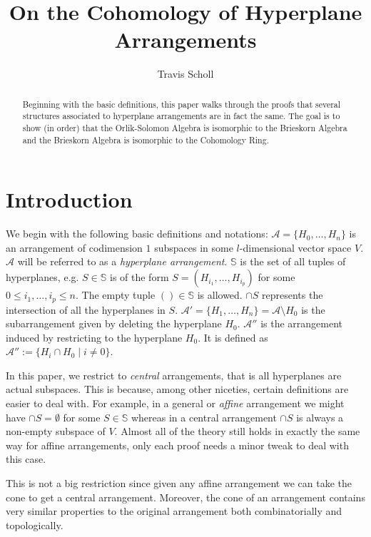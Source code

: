 \documentclass[article,twoside]{article}
\newcommand{\mytitle}{On the Cohomology of Hyperplane Arrangements}
\newcommand{\myauthor}{Travis Scholl}
\newcommand{\BB}[1]{\mathbb{#1}}
\newcommand{\script}[1]{\mathcal{#1}}
\newcommand{\tuples}{\BB{S}}
\theoremstyle{plain}
\theoremstyle{plain}
\theoremstyle{plain}
\theoremstyle{plain}
\theoremstyle{plain}
\theoremstyle{definition}
\theoremstyle{definition}
\theoremstyle{definition}
\theoremstyle{remark}
\theoremstyle{remark}
\begin{document}
\title{\bfseries\sffamily \mytitle}  
\author{\sc \myauthor }
\maketitle

\begin{abstract}
Beginning with the basic definitions, this paper walks through the proofs that several structures associated to hyperplane arrangements are in fact the same. The goal is to show (in order) that the Orlik-Solomon Algebra is isomorphic to the Brieskorn Algebra and the Brieskorn Algebra is isomorphic to the Cohomology Ring.

\end{abstract}

\setcounter{section}{-1}

\section{Introduction}
	\hfil

	We begin with the following basic definitions and notations: $\script{A}=\{H_0,\dots,H_n\}$ is an arrangement of codimension $1$ subspaces in some $l$-dimensional vector space $V$. $\script{A}$ will be referred to as a \emph{hyperplane arrangement}. $\tuples$ is the set of all tuples of hyperplanes, e.g. $S\in \tuples$ is of the form $S=(H_{i_1},\dots,H_{i_p})$ for some $0\leq i_1,\dots,i_p\leq n$. The empty tuple $()\in \tuples$ is allowed. $\cap S$ represents the intersection of all the hyperplanes in $S$. $\script{A}'=\{H_1,\dots,H_n\}=\script{A}\setminus H_0$ is the subarrangement given by deleting the hyperplane $H_0$. $\script{A}''$ is the arrangement induced by restricting to the hyperplane $H_0$. It is defined as $\script{A}'':=\{H_i\cap H_0 \mid i\neq 0\}$.
	
	In this paper, we restrict to \emph{central} arrangements, that is all hyperplanes are actual subspaces. This is because, among other niceties, certain definitions are easier to deal with. For example, in a general or \emph{affine} arrangement we might have $\cap S=\emptyset$ for some $S\in\tuples$ whereas in a central arrangement $\cap S$ is always a non-empty subspace of $V$. Almost all of the theory still holds in exactly the same way for affine arrangements, only each proof needs a minor tweak to deal with this case.
	
	This is not a big restriction since given any affine arrangement we can take the cone to get a central arrangement. Moreover, the cone of an arrangement contains very similar properties to the original arrangement both combinatorially and topologically.
\end{document}
